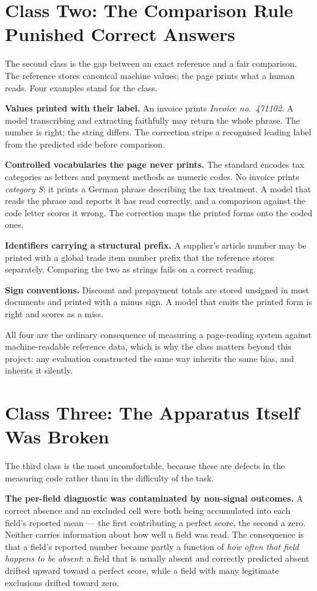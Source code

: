 \section{Class Two: The Comparison Rule Punished Correct Answers}
\label{sec:validity-comparison}

The second class is the gap between an exact reference and a fair comparison. The reference
stores canonical machine values; the page prints what a human reads. Four examples stand for
the class.

\textbf{Values printed with their label.} An invoice prints \emph{Invoice no.\ 471102}. A model
transcribing and extracting faithfully may return the whole phrase. The number is right; the
string differs. The correction strips a recognised leading label from the predicted side before
comparison.

\textbf{Controlled vocabularies the page never prints.} The standard encodes tax categories as
letters and payment methods as numeric codes. No invoice prints \emph{category S}; it prints a
German phrase describing the tax treatment. A model that reads the phrase and reports it has
read correctly, and a comparison against the code letter scores it wrong. The correction maps
the printed forms onto the coded ones.

\textbf{Identifiers carrying a structural prefix.} A supplier's article number may be printed
with a global trade item number prefix that the reference stores separately. Comparing the two
as strings fails on a correct reading.

\textbf{Sign conventions.} Discount and prepayment totals are stored unsigned in most
documents and printed with a minus sign. A model that emits the printed form is right and
scores as a miss.

All four are the ordinary consequence of measuring a
page-reading system against machine-readable reference data, which is why the class matters
beyond this project: any evaluation constructed the same way inherits the same bias, and
inherits it silently.

\section{Class Three: The Apparatus Itself Was Broken}
\label{sec:validity-apparatus}

The third class is the most uncomfortable, because these are defects in the measuring code
rather than in the difficulty of the task.

\textbf{The per-field diagnostic was contaminated by non-signal outcomes.} A correct absence
and an excluded cell were both being accumulated into each field's reported mean --- the first
contributing a perfect score, the second a zero. Neither carries information about how well a
field was read. The consequence is that a field's reported number became partly a function of
\emph{how often that field happens to be absent}: a field that is usually absent and correctly
predicted absent drifted upward toward a perfect score, while a field with many legitimate
exclusions drifted toward zero.

